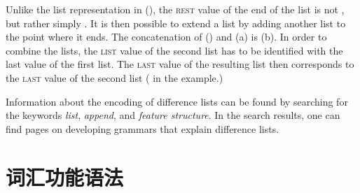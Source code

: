 \begin{enumerate}
Unlike the list representation in (), the \textsc{rest} value of the end of the list is not , but rather
simply . It is then possible to extend a list by adding another list to the point where it ends. The concatenation of 
() and (a) is (b).
\eal
\ex 
{}
\ex
{}
\zl
In order to combine the lists, the \textsc{list} value of the second list has to be identified with the {\sc
  last} value of the first list. The \textsc{last} value of the resulting list then corresponds to the
  \textsc{last} value of the second list ( in the example.)

Information about the encoding of difference lists can be found by searching for the keywords  \emph{list}, \emph{append}, and
\emph{feature structure}. In the search results, one can find pages on developing grammars that explain
difference lists.
\end{enumerate}



\section{词汇功能语法}

